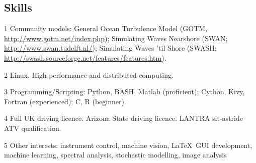 \documentclass[margin,line]{resume}
\begin{document}
\begin{resume}
    \section{\mysidestyle Skills} 
    \begin{footnotesize}
    \begin{list1}
        \item[1] Community models: General Ocean Turbulence Model (GOTM, \url{http://www.gotm.net/index.php}); Simulating Waves Nearshore (SWAN; \url{http://www.swan.tudelft.nl/}); Simulating Waves 'til Shore (SWASH; \url{http://swash.sourceforge.net/features/features.htm}).\\
        \item[2] Linux. High performance and distributed computing.\\
        \item[3] Programming/Scripting: Python, BASH, Matlab (proficient); Cython, Kivy, Fortran (experienced); C, R (beginner).\\
        \item[4] Full UK driving licence. Arizona State driving licence. LANTRA sit-astride ATV qualification.\\
        \item[5] Other interests: instrument control, machine vision, \LaTeX\, GUI development, machine learning, spectral analysis, stochastic modelling, image analysis
    \end{list1}
     \end{footnotesize}


\end{resume}
\end{document}
